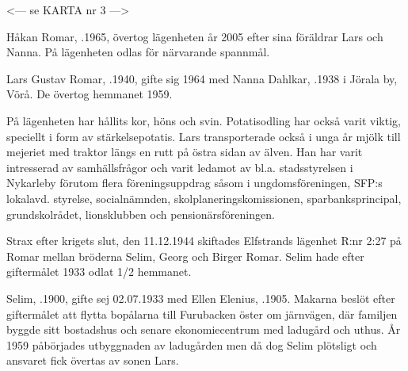 <--- se KARTA nr 3 --->



%



%

Håkan Romar, .1965, övertog lägenheten år 2005 efter sina föräldrar Lars och Nanna. På lägenheten odlas för närvarande spannmål.


%
Lars Gustav Romar, .1940, gifte sig 1964 med Nanna Dahlkar, .1938 i Jörala by, Vörå. De övertog hemmanet 1959.
\begin{jhchildren}
  \item {}
  \item {}
\end{jhchildren}

På lägenheten har hållits kor, höns och svin. Potatisodling har också varit viktig, speciellt i form av stärkelsepotatis. Lars transporterade också i unga år mjölk till mejeriet med traktor längs en rutt på östra sidan av älven. Han har varit intresserad av samhällsfrågor och varit ledamot av bl.a. stadsstyrelsen i Nykarleby förutom flera föreningsuppdrag såsom i ungdomsföreningen, SFP:s lokalavd. styrelse, socialnämnden, skolplaneringskomissionen, sparbanksprincipal, grundskolrådet, lionsklubben och pensionärsföreningen.


%

Strax efter krigets slut, den 11.12.1944 skiftades Elfstrands lägenhet R:nr 2:27 på Romar mellan bröderna Selim, Georg och Birger Romar. Selim hade efter giftermålet 1933 odlat 1/2 hemmanet.

Selim, .1900, gifte sej 02.07.1933 med Ellen Elenius, .1905. Makarna beslöt efter giftermålet att flytta bopålarna till Furubacken öster om järnvägen, där familjen byggde sitt bostadshus och senare ekonomiecentrum med ladugård och uthus. År 1959 påbörjades utbyggnaden av ladugården men då dog Selim plötsligt och ansvaret fick övertas av sonen Lars.

